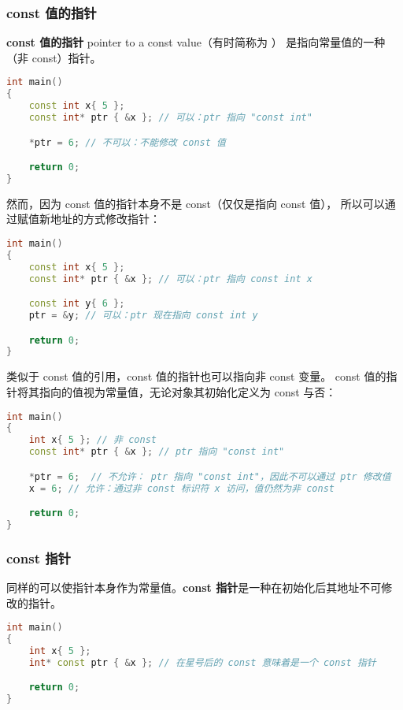 \documentclass[../../LearnCpp.tex]{subfiles}
\begin{document}

\subsubsection*{const 值的指针}

\textbf{const 值的指针} pointer to a const value（有时简称为 ）
是指向常量值的一种（非 const）指针。

\begin{lstlisting}[language=C++]
int main()
{
    const int x{ 5 };
    const int* ptr { &x }; // 可以：ptr 指向 "const int"

    *ptr = 6; // 不可以：不能修改 const 值

    return 0;
}
\end{lstlisting}

然而，因为 const 值的指针本身不是 const（仅仅是指向 const 值），
所以可以通过赋值新地址的方式修改指针：

\begin{lstlisting}[language=C++]
int main()
{
    const int x{ 5 };
    const int* ptr { &x }; // 可以：ptr 指向 const int x

    const int y{ 6 };
    ptr = &y; // 可以：ptr 现在指向 const int y

    return 0;
}
\end{lstlisting}

类似于 const 值的引用，const 值的指针也可以指向非 const 变量。
const 值的指针将其指向的值视为常量值，无论对象其初始化定义为 const 与否：

\begin{lstlisting}[language=C++]
int main()
{
    int x{ 5 }; // 非 const
    const int* ptr { &x }; // ptr 指向 "const int"

    *ptr = 6;  // 不允许： ptr 指向 "const int"，因此不可以通过 ptr 修改值
    x = 6; // 允许：通过非 const 标识符 x 访问，值仍然为非 const

    return 0;
}
\end{lstlisting}

\subsubsection*{const 指针}

同样的可以使指针本身作为常量值。\textbf{const 指针}是一种在初始化后其地址不可修改的指针。

\begin{lstlisting}[language=C++]
int main()
{
    int x{ 5 };
    int* const ptr { &x }; // 在星号后的 const 意味着是一个 const 指针

    return 0;
}
\end{lstlisting}
\end{document}
